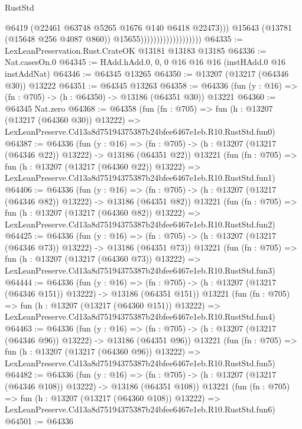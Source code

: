 \begin{lexlean}{RustStd}
\begin{coremodule}
                                              @6419
                                              (@22461 @63748 @5265 @1676 @140 @6418 @22473)))
                                          @15643
                                          (@13781 (@15648 @256 @4087 @860))
                                          @15655)))))))))))))))))))
@64335 := LexLeanPreservation.Rust.CrateOK @13181 @13183 @13185
@64336 := Nat.casesOn.{0}
@64345 := HAdd.hAdd.{0, 0, 0} @16 @16 @16 (instHAdd.{0} @16 instAddNat)
@64346 := @64345 @13265
@64350 := @13207 (@13217 (@64346 @30)) @13222
@64351 := @64345 @13263
@64358 := @64336 (fun (y : @16) => (fn : @705) -> (h : @64350) -> @13186 (@64351 @30)) @13221
@64360 := @64345 Nat.zero
@64368 := @64358
    (fun (fn : @705) =>
    fun (h : @13207 (@13217 (@64360 @30)) @13222) =>
    LexLeanPreserve.Cd13a8d75194375387b24bfee6467e1eb.R10.RustStd.fun0)
@64387 := @64336
    (fun (y : @16) =>
    (fn : @705) -> (h : @13207 (@13217 (@64346 @22)) @13222) -> @13186 (@64351 @22))
    @13221
    (fun (fn : @705) =>
    fun (h : @13207 (@13217 (@64360 @22)) @13222) =>
    LexLeanPreserve.Cd13a8d75194375387b24bfee6467e1eb.R10.RustStd.fun1)
@64406 := @64336
    (fun (y : @16) =>
    (fn : @705) -> (h : @13207 (@13217 (@64346 @82)) @13222) -> @13186 (@64351 @82))
    @13221
    (fun (fn : @705) =>
    fun (h : @13207 (@13217 (@64360 @82)) @13222) =>
    LexLeanPreserve.Cd13a8d75194375387b24bfee6467e1eb.R10.RustStd.fun2)
@64425 := @64336
    (fun (y : @16) =>
    (fn : @705) -> (h : @13207 (@13217 (@64346 @73)) @13222) -> @13186 (@64351 @73))
    @13221
    (fun (fn : @705) =>
    fun (h : @13207 (@13217 (@64360 @73)) @13222) =>
    LexLeanPreserve.Cd13a8d75194375387b24bfee6467e1eb.R10.RustStd.fun3)
@64444 := @64336
    (fun (y : @16) =>
    (fn : @705) -> (h : @13207 (@13217 (@64346 @151)) @13222) -> @13186 (@64351 @151))
    @13221
    (fun (fn : @705) =>
    fun (h : @13207 (@13217 (@64360 @151)) @13222) =>
    LexLeanPreserve.Cd13a8d75194375387b24bfee6467e1eb.R10.RustStd.fun4)
@64463 := @64336
    (fun (y : @16) =>
    (fn : @705) -> (h : @13207 (@13217 (@64346 @96)) @13222) -> @13186 (@64351 @96))
    @13221
    (fun (fn : @705) =>
    fun (h : @13207 (@13217 (@64360 @96)) @13222) =>
    LexLeanPreserve.Cd13a8d75194375387b24bfee6467e1eb.R10.RustStd.fun5)
@64482 := @64336
    (fun (y : @16) =>
    (fn : @705) -> (h : @13207 (@13217 (@64346 @108)) @13222) -> @13186 (@64351 @108))
    @13221
    (fun (fn : @705) =>
    fun (h : @13207 (@13217 (@64360 @108)) @13222) =>
    LexLeanPreserve.Cd13a8d75194375387b24bfee6467e1eb.R10.RustStd.fun6)
@64501 := @64336

\end{coremodule}
\end{lexlean}
